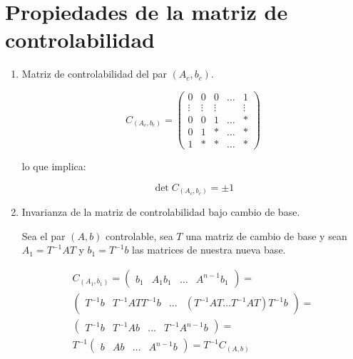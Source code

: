     \section{Propiedades de la matriz de controlabilidad}

        \begin{enumerate}
            \item Matriz de controlabilidad del par $(A_c, b_c)$.

                \begin{equation}
                    C_{(A_c,b_c)} =
                    \begin{pmatrix}
                    0 & 0 & 0 & \dots & 1 \\
                    \vdots & \vdots & \vdots & & \vdots \\
                    0 & 0 & 1 & \dots & * \\
                    0 & 1 & * & \dots & * \\
                    1 & * & * & \dots & *
                    \end{pmatrix}
                \end{equation}

                lo que implica:

                \begin{equation}
                    \det{C_{(A_c, b_c)}} = \pm 1
                \end{equation}

            \item Invarianza de la matriz de controlabilidad bajo cambio de base.

                Sea el par $(A, b)$ controlable, sea $T$ una matriz de cambio de base y sean $A_1 = T^{-1} A T$ y $b_1 = T^{-1} b$ las matrices de nuestra nueva base.

                \begin{multline}
                C_{(A_1, b_1)} =
                \begin{pmatrix}
                b_1 & A_1 b_1 & \dots & A^{n-1} b_1
                \end{pmatrix} = \\
                \begin{pmatrix}
                T^{-1} b & T^{-1} A T T^{-1} b & \dots & (T^{-1} A T \dots T^{-1} A T) T^{-1} b
                \end{pmatrix} = \\
                \begin{pmatrix}
                T^{-1} b & T^{-1} A b & \dots & T^{-1} A^{n-1} b
                \end{pmatrix} = \\
                T^{-1}
                \begin{pmatrix}
                b & A b & \dots & A^{n-1} b
                \end{pmatrix} =
                T^{-1} C_{(A, b)} \nonumber
                \end{multline}


\end{enumerate}
